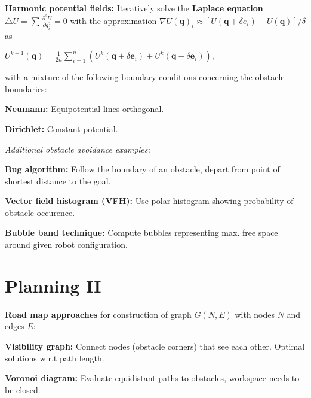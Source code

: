\documentclass[landscape]{article}
\newcommand{\vmspace}{\vspace{-7pt}}
\newcommand{\vpspace}{\vspace{5pt}}
\newcommand{\vtspace}{\vspace{-10pt}}
\begin{document}
\begin{multicols}{3}
\begin{minipage}{\columnwidth}
  \textbf{Harmonic potential fields:} Iteratively solve the \textbf{Laplace
  equation}
  $
  \bigtriangleup U = \sum \frac{\partial^2 U}{\partial q_i^2} = 0
  $ with the approximation
  $
  \nabla U(\mathbf q)_i
  \approx
  [U(\mathbf q + \delta e_i) - U(\mathbf q)]/\delta
  $
  as
  \vmspace
  \begin{center}
    $
    U^{k+1}(\mathbf q)
    =
    \frac{1}{2n} \sum_{i=1}^n(U^k(\mathbf q + \delta \mathbf e_i)
    + U^k(\mathbf q - \delta \mathbf e_i)),
    $
  \end{center}
  \vmspace
  with a mixture of the following boundary conditions concerning the obstacle
  boundaries:
  \begin{compactitem}
  \item \textbf{Neumann:} Equipotential lines orthogonal.
  \item \textbf{Dirichlet:} Constant potential.
  \end{compactitem}
\end{minipage}

\vpspace

\begin{minipage}{\columnwidth}
  \textit{Additional obstacle avoidance examples:}
  \begin{compactitem}
  \item \textbf{Bug algorithm:} Follow the boundary of an obstacle, depart from
    point of shortest distance to the goal.
  \item \textbf{Vector field histogram (VFH):} Use polar histogram showing
    probability of obstacle occurence.
  \item \textbf{Bubble band technique:} Compute bubbles representing max.
    free space around given robot configuration.
  \end{compactitem}
\end{minipage}

\vfill

\vtspace

\section{Planning II}

\vmspace

\begin{minipage}{\columnwidth}
  \textbf{Road map approaches} for construction of graph $G(N,E)$ with nodes $N$
  and edges $E$:
  \begin{compactitem}
  \item \textbf{Visibility graph:} Connect nodes (obstacle corners) that
    see each other. Optimal solutions w.r.t path length.
  \item \textbf{Voronoi diagram:} Evaluate equidistant paths to obstacles,
    workspace needs to be closed.
  \end{compactitem}
\end{minipage}


\end{multicols}
\end{document}
